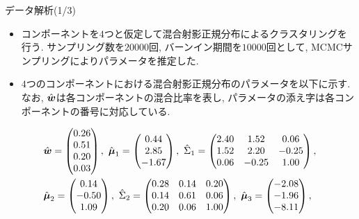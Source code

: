\documentclass[dvipdfmx]{beamer} %
\newcommand{\bm}[1]{\mbox{\boldmath $#1$}}
\begin{document}
\begin{frame}{データ解析(1/3)}

\begin{itemize}
	\item 
	コンポーネントを$4$つと仮定して混合射影正規分布によるクラスタリングを行う. サンプリング数を$20000$回, バーンイン期間を$10000$回として, MCMCサンプリングによりパラメータを推定した.
	\item
	$4$つのコンポーネントにおける混合射影正規分布のパラメータを以下に示す. なお, $\hat {\bm w}$は各コンポーネントの混合比率を表し, パラメータの添え字は各コンポーネントの番号に対応している.
\end{itemize}
 
\footnotesize %
\begin{equation*}
\begin{split}
&\hat {\bm w} = \begin{pmatrix} 0.26 \\ 0.51 \\ 0.20 \\ 0.03 \\ \end{pmatrix},\ 
\hat{\bm \mu}_1 = \begin{pmatrix} 0.44 \\ 2.85 \\ -1.67 \\ \end{pmatrix},\ 
\hat \Sigma_1 = \begin{pmatrix}  2.40 & 1.52 &  0.06 \\ 1.52 & 2.20 & -0.25 \\ 0.06 & -0.25 &1.00 \\ \end{pmatrix},\\ 
&\hat{\bm \mu}_2 = \begin{pmatrix} 0.14 \\ -0.50 \\ 1.09 \\ \end{pmatrix},\ 
\hat \Sigma_2 = \begin{pmatrix}   0.28  & 0.14 &  0.20 \\ 0.14 & 0.61 & 0.06 \\  0.20 & 0.06 &1.00 \\ \end{pmatrix},\ 
\hat{\bm \mu}_3 = \begin{pmatrix} -2.08  \\ -1.96 \\ -8.11 \\ \end{pmatrix},\\ 

\end{split}
\end{equation*}
\end{frame}
\end{document}
